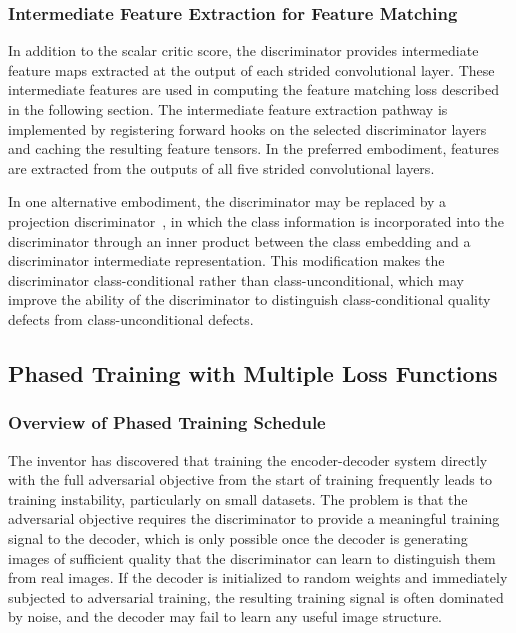 \documentclass[12pt,letterpaper]{article}
\begin{document}
\subsubsection{Intermediate Feature Extraction for Feature Matching}

In addition to the scalar critic score, the discriminator provides intermediate
feature maps extracted at the output of each strided convolutional layer. These
intermediate features are used in computing the feature matching loss described
in the following section. The intermediate feature extraction pathway is
implemented by registering forward hooks on the selected discriminator layers
and caching the resulting feature tensors. In the preferred embodiment, features
are extracted from the outputs of all five strided convolutional layers.

In one alternative embodiment, the discriminator may be replaced by a
projection discriminator~\cite{miyato2018}, in which the class information is
incorporated into the discriminator through an inner product between the class
embedding and a discriminator intermediate representation. This modification
makes the discriminator class-conditional rather than class-unconditional,
which may improve the ability of the discriminator to distinguish
class-conditional quality defects from class-unconditional defects.

\subsection{Phased Training with Multiple Loss Functions}

\subsubsection{Overview of Phased Training Schedule}

The inventor has discovered that training the encoder-decoder system directly
with the full adversarial objective from the start of training frequently leads
to training instability, particularly on small datasets. The problem is that
the adversarial objective requires the discriminator to provide a meaningful
training signal to the decoder, which is only possible once the decoder is
generating images of sufficient quality that the discriminator can learn to
distinguish them from real images. If the decoder is initialized to random
weights and immediately subjected to adversarial training, the resulting
training signal is often dominated by noise, and the decoder may fail to
learn any useful image structure.
\end{document}
